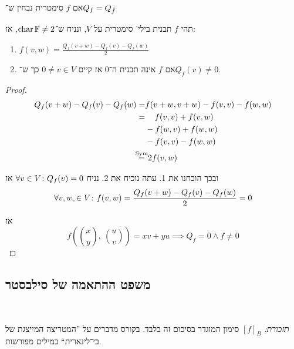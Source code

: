 \documentclass[name=רשימות אלגברה לינארית 2א]{../../../tex/classes/megasumPreamble}
\begin{document}
	אם $f$ סימטרית נבחין ש־$Q_f = Q_{\hat f}$
	
	\begin{Theorem}
		תהי $f$ תבנית בילי' סימטרית על $V$, ונניח ש־$\operatorname{char} \mathbb{F} \neq 2$, אז: 
		\begin{enumerate}
			\item \hfil $\displaystyle f(v, w) = \frac{Q_f(v + w) - Q_f(v) - Q_f(w)}{2}$
			\item אם $f$ אינה תבנית ה־$0$ אז קיים $0 \neq v \in V$ כך ש־$Q_f(v) \neq 0$. 
		\end{enumerate}
	\end{Theorem}
	\begin{proof}
		\begin{align*}
			Q_f(v + w) - Q_f(v) - Q_f(w) = &f(v + w, v + w) - f(v, v) - f(w, w) \\
			= &\quad\, f(v, v) + f(v, w) \\
			&-f(w, v) + f(w, w) \\
			&-f(v, v) - f(w, w) \\
			\overset{\operatorname{Sym}}{=} \!\!&\,\, 2f(v, w)
		\end{align*}
		
		ובכך הוכחנו את 1. 
		עתה נוכיח את 2. נניח $\forall v \in V \colon Q_f(v) = 0$ אז
		\[ \forall v, w, \in V \colon f(v, w) = \frac{Q_f(v + w) - Q_f(v) - Q_f(w)}{2} = 0  \]
		
		אז
		\[ \textstyle f(\binom{x}{y}, \ \binom{u}{v}) = xv + yu \implies Q_f = 0 \land f \neq 0 \]
	\end{proof}
	
	
	
	\subsection{משפט ההתאמה של סילבסטר}\ 
	
	
	\textit{תזכורת: }$[f]_B$ סימון המוגדר בסיכום זה בלבד. בקורס מדברים על ''המטריצה המייצגת של בי־לינארית`` במילים מפורשות. 
	
\end{document}

